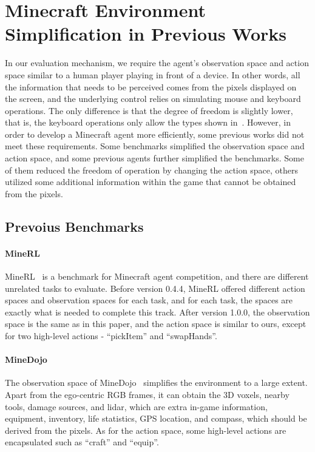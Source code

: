 \section{Minecraft Environment Simplification in Previous Works}
\label{app.simplification}
In our evaluation mechanism, we require the agent's observation space and action space similar to a human player playing in front of a device. In other words, all the information that needs to be perceived comes from the pixels displayed on the screen, and the underlying control relies on simulating mouse and keyboard operations. The only difference is that the degree of freedom is slightly lower, that is, the keyboard operations only allow the types shown in~.  However, in order to develop a Minecraft agent more efficiently, some previous works did not meet these requirements. Some benchmarks simplified the observation space and action space, and some previous agents further simplified the benchmarks. Some of them reduced the freedom of operation by changing the action space, others utilized some additional information within the game that cannot be obtained from the pixels.

\subsection{Prevoius Benchmarks}

\paragraph{MineRL} MineRL~\citep{minerl} is a benchmark for Minecraft agent competition, and there are different unrelated tasks to evaluate. Before version 0.4.4, MineRL offered different action spaces and observation spaces for each task, and for each task, the spaces are exactly what is needed to complete this track. After version 1.0.0, the observation space is the same as in this paper, and the action space is similar to ours, except for two high-level actions - ``pickItem'' and ``swapHands''.

\paragraph{MineDojo} The observation space of MineDojo~\citep{minedojo} simplifies the environment to a large extent. Apart from the ego-centric RGB frames, it can obtain the 3D voxels, nearby tools, damage sources, and lidar, which are extra in-game information, equipment, inventory, life statistics, GPS location, and compass, which should be derived from the pixels. As for the action space, some high-level actions are encapsulated such as ``craft'' and ``equip''.

